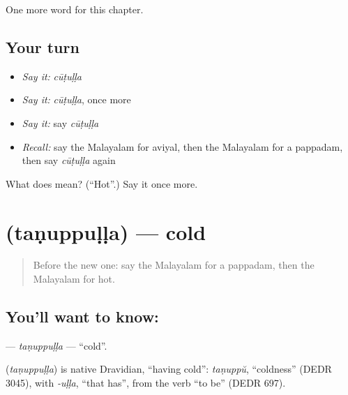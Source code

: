 \begin{grammarlens}[title={What you've built}]
One more word for this chapter.
\end{grammarlens}

\subsection*{Your turn}
\begin{itemize}
\raggedright
  \item \emph{Say it:} \emph{cūṭuḷḷa}
  \item \emph{Say it:} \emph{cūṭuḷḷa}, once more
  \item \emph{Say it:} say \emph{cūṭuḷḷa}
  \item \emph{Recall:} say the Malayalam for aviyal, then the Malayalam for a pappadam, then say \emph{cūṭuḷḷa} again
\end{itemize}

\begin{tcolorbox}[breakable,colback=teal!4,colframe=teal!35!black,title={Before you move on}]
What does  mean? (\textquotedblleft{}Hot\textquotedblright{}.) Say it once more.
\end{tcolorbox}
\section[\texorpdfstring{\ml{തണുപ്പുള്ള} (taṇuppuḷḷa)}{തണുപ്പുള്ള (taṇuppuḷḷa)}]{ (taṇuppuḷḷa) — cold}

\label{lesson:ML-C164-tanuppulla}



\begin{quote}
Before the new one: say the Malayalam for a pappadam, then the Malayalam for hot.
\end{quote}

\subsection*{You'll want to know: }
\textbf{} — \emph{taṇuppuḷḷa} — \textquotedblleft{}cold\textquotedblright{}.

\begin{cousinweb}
\textbf{} (\emph{taṇuppuḷḷa}) is native Dravidian, \textquotedblleft{}having cold\textquotedblright{}: \emph{taṇuppŭ}, \textquotedblleft{}coldness\textquotedblright{} (DEDR 3045), with \emph{-uḷḷa}, \textquotedblleft{}that has\textquotedblright{}, from the verb \textquotedblleft{}to be\textquotedblright{} (DEDR 697).
\end{cousinweb}


